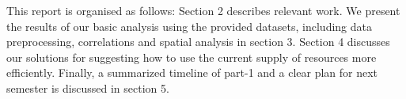 This report is organised as follows: Section 2 describes relevant work. We present the results of our basic analysis using the provided datasets, including data preprocessing, correlations and spatial analysis in section 3. Section 4 discusses our solutions for suggesting how to use the current supply of resources more efficiently. Finally, a summarized timeline of part-1 and a clear plan for next semester is discussed in section 5.